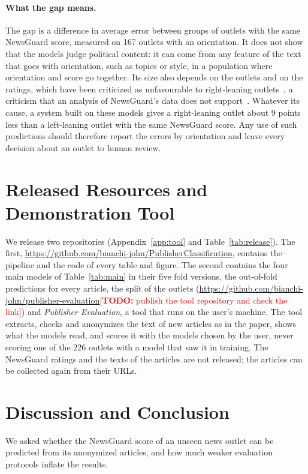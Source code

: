 \documentclass[11pt,a4paper]{article}
\newcommand{\todo}[1]{\textcolor{red}{[\textbf{TODO:} #1]}}
\begin{document}
\paragraph{What the gap means.} The gap is a difference in average error between groups of outlets with the same
NewsGuard score, measured on 167 outlets with an orientation. It does not show that the models judge political content:
it can come from any feature of the text that goes with orientation, such as topics or style, in a population where
orientation and score go together. Its size also depends on the outlets and on the ratings, which have been criticized as
unfavourable to right-leaning outlets~\cite{oremus2024newsguard}, a criticism that an analysis of NewsGuard's data does
not support~\cite{luhring2025best}. Whatever its cause, a system built on these models gives a right-leaning outlet
about 9 points less than a left-leaning outlet with the same NewsGuard score. Any use of such predictions should
therefore report the errors by orientation and leave every decision about an outlet to human review.

\section{Released Resources and Demonstration Tool}\label{sec:tool}
We release two repositories (Appendix~\ref{app:tool} and Table~\ref{tab:release}). The first,
\url{https://github.com/bianchi-john/PublisherClassification}, contains the pipeline and the code of every table and
figure. The second contains the four main models of
Table~\ref{tab:main} in their five fold versions, the out-of-fold predictions for every article, the split of the
outlets (\url{https://github.com/bianchi-john/publisher-evaluation}\todo{publish the tool repository and check the link})
and \emph{Publisher Evaluation}, a tool that runs on the user's machine. The tool extracts, checks and anonymizes the
text of new articles as in the paper, shows what the models read, and scores it with the models chosen by the user,
never scoring one of the 226 outlets with a model that saw it in training. The NewsGuard ratings and the texts of the
articles are not released; the articles can be collected again from their URLs.

\section{Discussion and Conclusion}\label{sec:conclusion}
We asked whether the NewsGuard score of an unseen news outlet can be predicted from its anonymized articles, and how
much weaker evaluation protocols inflate the results.
\end{document}
